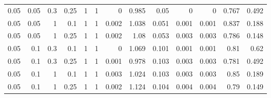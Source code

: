 \begin{table}[!htbp]
\begin{tabular}{lrrrrrrrrrrrr}
0.05 & 0.05 & 0.3 & 0.25 & 1 & 1 & 0 & 0.985 & 0.05 & 0 & 0 & 0.767 & 0.492 \\
0.05 & 0.05 & 1 & 0.1 & 1 & 1 & 0.002 & 1.038 & 0.051 & 0.001 & 0.001 & 0.837 & 0.188 \\
0.05 & 0.05 & 1 & 0.25 & 1 & 1 & 0.002 & 1.08 & 0.053 & 0.003 & 0.003 & 0.786 & 0.148 \\
0.05 & 0.1 & 0.3 & 0.1 & 1 & 1 & 0 & 1.069 & 0.101 & 0.001 & 0.001 & 0.81 & 0.62 \\
0.05 & 0.1 & 0.3 & 0.25 & 1 & 1 & 0.001 & 0.978 & 0.103 & 0.003 & 0.003 & 0.781 & 0.492 \\
0.05 & 0.1 & 1 & 0.1 & 1 & 1 & 0.003 & 1.024 & 0.103 & 0.003 & 0.003 & 0.85 & 0.189 \\
0.05 & 0.1 & 1 & 0.25 & 1 & 1 & 0.002 & 1.124 & 0.104 & 0.004 & 0.004 & 0.79 & 0.149 \\
\hline
\end{tabular}
\end{table}
